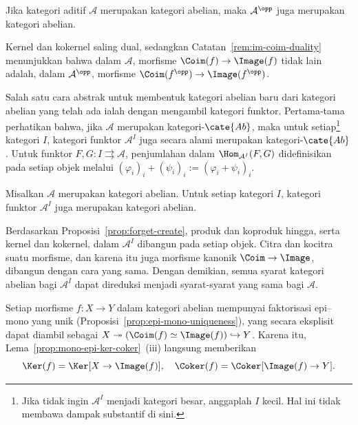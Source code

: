 \begin{proposisi}\label{prop:abelian-cat-duality}
	Jika kategori aditif $\mathcal{A}$ merupakan kategori abelian, maka
	$\mathcal{A}^{\opp}$ juga merupakan kategori abelian.
\end{proposisi}
\begin{bukti}
	Kernel dan kokernel saling dual, sedangkan
	Catatan~\ref{rem:im-coim-duality} menunjukkan bahwa dalam $\mathcal{A}$,
	morfisme $\Coim(f) \to \Image(f)$ tidak lain adalah, dalam
	$\mathcal{A}^{\opp}$, morfisme
	$\Coim(f^{\opp}) \to \Image(f^{\opp})$.
\end{bukti}

Salah satu cara abstrak untuk membentuk kategori abelian baru dari kategori
abelian yang telah ada ialah dengan mengambil kategori funktor. Pertama-tama
perhatikan bahwa, jika $\mathcal{A}$ merupakan kategori-$\cate{Ab}$, maka untuk
setiap\footnote{Jika tidak ingin $\mathcal{A}^I$ menjadi kategori besar,
anggaplah $I$ kecil. Hal ini tidak membawa dampak substantif di sini.} kategori
$I$,
	kategori funktor $\mathcal{A}^I$ juga secara alami merupakan
	kategori-$\cate{Ab}$. Untuk funktor
	$F, G: I \rightrightarrows \mathcal{A}$, penjumlahan dalam
	$\Hom_{\mathcal{A}^I}(F, G)$ didefinisikan pada setiap objek melalui
$(\varphi_i)_i + (\psi_i)_i := (\varphi_i + \psi_i)_i$.

\begin{proposisi}\label{prop:functor-cat-Abel}
	Misalkan $\mathcal{A}$ merupakan kategori abelian. Untuk setiap kategori
	$I$, kategori funktor $\mathcal{A}^I$ juga merupakan kategori abelian.
\end{proposisi}
\begin{bukti}
	Berdasarkan Proposisi~\ref{prop:forget-create}, produk dan koproduk hingga,
	serta kernel dan kokernel, dalam $\mathcal{A}^I$ dibangun pada setiap objek.
	Citra dan kocitra suatu morfisme, dan karena itu juga morfisme kanonik
	$\Coim \to \Image$, dibangun dengan cara yang sama. Dengan demikian,
	semua syarat kategori abelian bagi $\mathcal{A}^I$ dapat direduksi menjadi
	syarat-syarat yang sama bagi $\mathcal{A}$.
\end{bukti}

Setiap morfisme $f: X \to Y$ dalam kategori abelian mempunyai faktorisasi
epi--mono yang unik (Proposisi~\ref{prop:epi-mono-uniqueness}), yang secara
eksplisit dapat diambil sebagai
$X \twoheadrightarrow \left(\Coim(f) \simeq \Image(f)\right)
\hookrightarrow Y$. Karena itu, Lema~\ref{prop:mono-epi-ker-coker}~(iii)
langsung memberikan
\[ \Ker(f) = \Ker[X \to \Image(f)], \quad \Coker(f) = \Coker[\Image(f) \to Y]. \]

